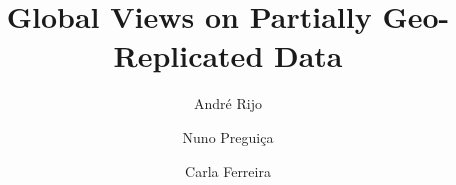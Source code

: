 \documentclass[sigplan,review,anonymous]{acmart}
\begin{document}

\title{Global Views on Partially Geo-Replicated Data}

%



\author{André Rijo}
\author{Nuno Preguiça}
\author{Carla Ferreira}
\end{document}
